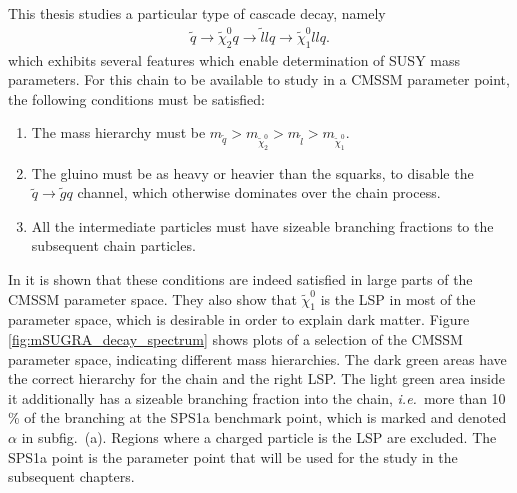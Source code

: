 \documentclass[twoside,english]{uiofysmaster}
\begin{document}
This thesis studies a particular type of cascade decay, namely
\begin{align}
	\tilde q \to \tilde\chi_2^0q \to \tilde l l q \to \tilde \chi_1^0 ll q.	\label{eq:susyintrochap_cascade}
\end{align}
which exhibits several features which enable determination of SUSY mass parameters. For this chain to be available to study in a CMSSM parameter point, the following conditions must be satisfied: 
\begin{enumerate}
	\item The mass hierarchy must be $m_{\tilde q} > m_{\tilde\chi_2^0} > m_{\tilde l} > m_{\tilde\chi_1^0}$.
	\item The gluino must be as heavy or heavier than the squarks, to disable the $\tilde q \to \tilde g q$ channel, which otherwise dominates over the chain process.
	\item All the intermediate particles must have sizeable branching fractions to the subsequent chain particles.
\end{enumerate}
In \cite{Gjelsten:2004ki} it is shown that these conditions are indeed satisfied in large parts of the CMSSM parameter space. They also show that $\tilde\chi_1^0$ is the LSP in most of the parameter space, which is desirable in order to explain dark matter. Figure \ref{fig:mSUGRA_decay_spectrum} shows plots of a selection of the CMSSM parameter space, indicating different mass hierarchies. The dark green areas have the correct hierarchy for the chain and the right LSP. The light green area inside it additionally has a sizeable branching fraction into the chain, {\it i.e.}\ more than 10 \% of the branching at the SPS1a benchmark point, which is marked and denoted $\alpha$ in subfig.\ (a). Regions where a charged particle is the LSP are excluded. The SPS1a point is the parameter point that will be used for the study in the subsequent chapters.
\end{document}
